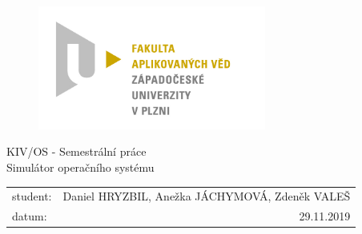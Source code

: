 \documentclass[11pt,a4paper]{scrartcl}
\begin{document}
	\begin{figure}[h!]
		\centering
		\includegraphics[bb= 0 0 820 445 , width=75mm]{favlogo.jpg}
	\end{figure}
	
	\vspace{5cm}
	
	{\centering
		{\huge KIV/OS - Semestrální práce}\\[1em]
		{\large Simulátor operačního systému}\\[7,5cm]
	}
	
	\begin{center}
		\begin{tabular}{l r}
		student: & Daniel HRYZBIL, Anežka JÁCHYMOVÁ, Zdeněk VALEŠ\\
		datum: & 29.11.2019\\
		\end{tabular}
	\end{center}
	
	\thispagestyle{empty}
	\newpage
	
\end{document}
